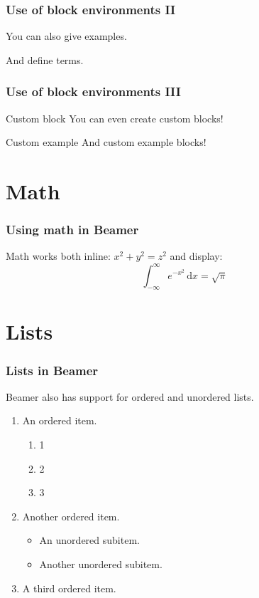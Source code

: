 \documentclass{beamer}
\begin{document}
\begin{frame}
  \frametitle{Use of block environments II}
  \begin{example}
    You can also give examples.
  \end{example}

  \begin{definition}
    And define \alert{terms}.
  \end{definition}
\end{frame}

\begin{frame}
  \frametitle{Use of block environments III}
  \begin{block}{Custom block}
    You can even create custom blocks!
  \end{block}

  \begin{exampleblock}{Custom example}
    And custom example blocks!
  \end{exampleblock}
\end{frame}

\section{Math}
\begin{frame}
  \frametitle{Using math in Beamer}

  Math works both inline: $x^{2} + y^{2} = z^{2}$
  and display:
  \[ \int_{-\infty}^{\infty} e^{-x^{2}} \, \mathrm{d}x = \sqrt{\pi} \]
\end{frame}

\section{Lists}
\begin{frame}
  \frametitle{Lists in Beamer}
  Beamer also has support for ordered and unordered lists.

  \begin{enumerate}
  \item An ordered item.
  \begin{enumerate}
    \item 1
    \item 2
    \item 3
  \end{enumerate}
  \item Another ordered item.
    \begin{itemize}
    \item An unordered subitem.
    \item Another unordered subitem.
    \end{itemize}
  \item A third ordered item.
  \end{enumerate}
\end{frame}
\end{document}

